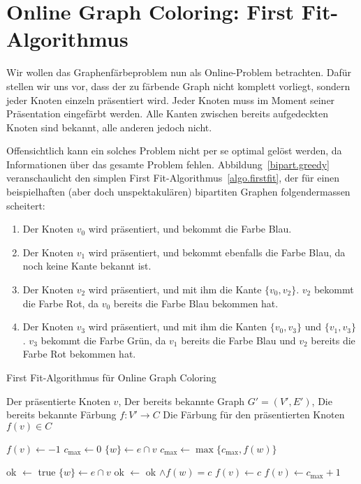 \documentclass[11pt,abstracton]{scrreprt} %
\theoremstyle{definition}
\begin{document}
\section{Online Graph Coloring: First Fit-Algorithmus}

Wir wollen das Graphenfärbeproblem nun als Online-Problem betrachten. Dafür stellen wir uns vor, dass der zu färbende Graph nicht komplett vorliegt, sondern jeder Knoten einzeln präsentiert wird. Jeder Knoten muss im Moment seiner Präsentation eingefärbt werden. Alle Kanten zwischen bereits aufgedeckten Knoten sind bekannt, alle anderen jedoch nicht. \cite{lovasz}

Offensichtlich kann ein solches Problem nicht per se optimal gelöst werden, da Informationen über das gesamte Problem fehlen. Abbildung~\ref{bipart.greedy} veranschaulicht den simplen First Fit-Algorithmus~\ref{algo.firstfit}, der für einen beispielhaften (aber doch unspektakulären) bipartiten Graphen folgendermassen scheitert:
\begin{enumerate}
\item Der Knoten $v_0$ wird präsentiert, und bekommt die Farbe Blau.
\item Der Knoten $v_1$ wird präsentiert, und bekommt ebenfalls die Farbe Blau, da noch keine Kante bekannt ist.
\item Der Knoten $v_2$ wird präsentiert, und mit ihm die Kante $\{v_0, v_2\}$. $v_2$ bekommt die Farbe Rot, da $v_0$ bereits die Farbe Blau bekommen hat.
\item Der Knoten $v_3$ wird präsentiert, und mit ihm die Kanten $\{v_0, v_3\}$ und $\{v_1, v_3\}$. $v_3$ bekommt die Farbe Grün, da $v_1$ bereits die Farbe Blau und $v_2$ bereits die Farbe Rot bekommen hat.
\end{enumerate}

\begin{algorithm}
\caption{First Fit-Algorithmus für Online Graph Coloring}
\label{algo.firstfit}
\begin{algorithmic}
\Require
	\State Der präsentierte Knoten $v$,
	\State Der bereits bekannte Graph $G' = (V', E')$,
	\State Die bereits bekannte Färbung $f : V' \rightarrow C$
\Ensure
	\State Die Färbung für den präsentierten Knoten $f(v) \in C$
\Statex

\State $f(v) \gets -1$
\State $c_\text{max} \gets 0 $
	\State $\{w\} \gets e \cap v$
	\State $c_\text{max} \gets \max \{c_\text{max}, f(w) \}$
\EndFor

\Statex

\State ok $\gets$ true
	\State $\{w\} \gets e \cap v$
	\State ok $\gets$ ok $\land f(w) = c$
\EndFor
{}
\State $f(v) \gets c$
\EndIf
\EndIf
\EndFor
\Statex
{}
\State $f(v) \gets c_\text{max} + 1$
\EndIf

\end{algorithmic}
\end{algorithm}
\end{document}
